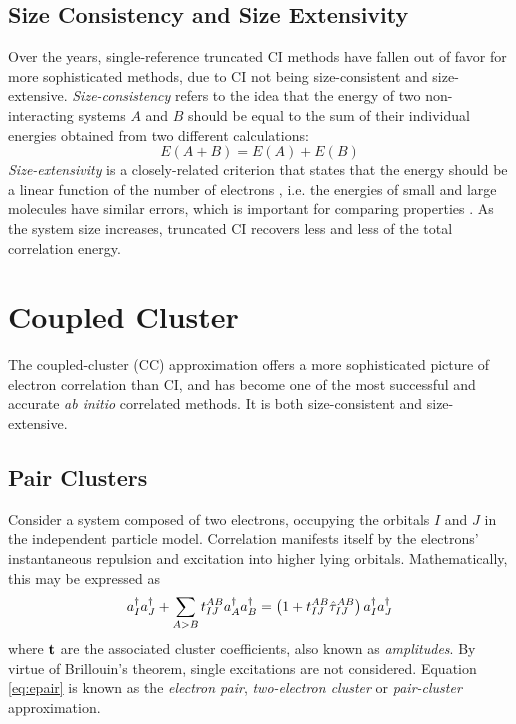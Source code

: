 \subsection{Size Consistency and Size Extensivity}

Over the years, single-reference truncated CI methods have fallen out of favor for more sophisticated methods, due to CI not being size-consistent and size-extensive. \emph{Size-consistency} refers to the idea that the energy of two non-interacting systems $A$ and $B$ should be equal to the sum of their individual energies obtained from two different calculations:
\begin{equation}
E(A+B) = E(A) + E(B)
\end{equation}
\noindent \emph{Size-extensivity} is a closely-related criterion that states that the energy should be a linear function of the number of electrons , i.e. the energies of small and large molecules have similar errors, which is important for comparing properties \cite{You2004}. As the system size increases, truncated CI recovers less and less of the total correlation energy.

\section{Coupled Cluster}

The coupled-cluster (CC) approximation offers a more sophisticated picture of electron correlation than CI, and has become one of the most successful and accurate \emph{ab initio} correlated methods. It is both size-consistent and size-extensive.

\subsection{Pair Clusters}

Consider a system composed of two electrons, occupying the orbitals $I$ and $J$ in the independent particle model. Correlation manifests itself by the electrons' instantaneous repulsion and excitation into higher lying orbitals. Mathematically, this may be expressed as \cite{Hel2000}
\begin{equation}
a^{\dagger}_I a^{\dagger}_J + \sum_{A > B} t_{IJ}^{AB} a^{\dagger}_A a^{\dagger}_B = \left( 1 + t_{IJ}^{AB} \hat{\tau}_{IJ}^{AB} \right) a^{\dagger}_I  a^{\dagger}_J 
\label{eq:epair}
\end{equation}
\noindent where $\mathbf{t}$ are the associated cluster coefficients, also known as \emph{amplitudes}. By virtue of Brillouin's theorem, single excitations are not considered. Equation \ref{eq:epair} is known as the \emph{electron pair}, \emph{two-electron cluster} or \emph{pair-cluster} approximation. 

